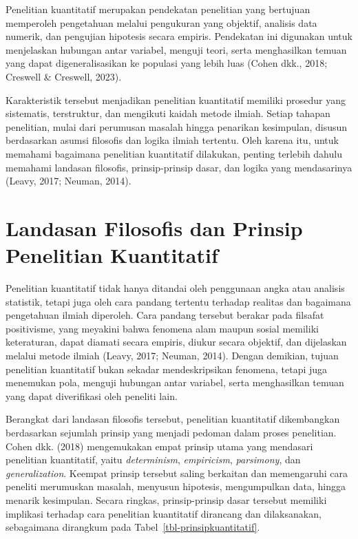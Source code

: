 \documentclass[
  indonesian,
  letterpaper,
  DIV=11,
  numbers=noendperiod]{scrreprt}
\begin{document}
Penelitian kuantitatif merupakan pendekatan penelitian yang bertujuan
memperoleh pengetahuan melalui pengukuran yang objektif, analisis data
numerik, dan pengujian hipotesis secara empiris. Pendekatan ini
digunakan untuk menjelaskan hubungan antar variabel, menguji teori,
serta menghasilkan temuan yang dapat digeneralisasikan ke populasi yang
lebih luas (Cohen dkk., 2018; Creswell \& Creswell, 2023).

Karakteristik tersebut menjadikan penelitian kuantitatif memiliki
prosedur yang sistematis, terstruktur, dan mengikuti kaidah metode
ilmiah. Setiap tahapan penelitian, mulai dari perumusan masalah hingga
penarikan kesimpulan, disusun berdasarkan asumsi filosofis dan logika
ilmiah tertentu. Oleh karena itu, untuk memahami bagaimana penelitian
kuantitatif dilakukan, penting terlebih dahulu memahami landasan
filosofis, prinsip-prinsip dasar, dan logika yang mendasarinya (Leavy,
2017; Neuman, 2014).

\section{Landasan Filosofis dan Prinsip Penelitian
Kuantitatif}\label{landasan-filosofis-dan-prinsip-penelitian-kuantitatif}

Penelitian kuantitatif tidak hanya ditandai oleh penggunaan angka atau
analisis statistik, tetapi juga oleh cara pandang tertentu terhadap
realitas dan bagaimana pengetahuan ilmiah diperoleh. Cara pandang
tersebut berakar pada filsafat positivisme, yang meyakini bahwa fenomena
alam maupun sosial memiliki keteraturan, dapat diamati secara empiris,
diukur secara objektif, dan dijelaskan melalui metode ilmiah (Leavy,
2017; Neuman, 2014). Dengan demikian, tujuan penelitian kuantitatif
bukan sekadar mendeskripsikan fenomena, tetapi juga menemukan pola,
menguji hubungan antar variabel, serta menghasilkan temuan yang dapat
diverifikasi oleh peneliti lain.

Berangkat dari landasan filosofis tersebut, penelitian kuantitatif
dikembangkan berdasarkan sejumlah prinsip yang menjadi pedoman dalam
proses penelitian. Cohen dkk. (2018) mengemukakan empat prinsip utama
yang mendasari penelitian kuantitatif, yaitu \emph{determinism},
\emph{empiricism}, \emph{parsimony}, dan \emph{generalization}. Keempat
prinsip tersebut saling berkaitan dan memengaruhi cara peneliti
merumuskan masalah, menyusun hipotesis, mengumpulkan data, hingga
menarik kesimpulan. Secara ringkas, prinsip-prinsip dasar tersebut
memiliki implikasi terhadap cara penelitian kuantitatif dirancang dan
dilaksanakan, sebagaimana dirangkum pada
Tabel~\ref{tbl-prinsipkuantitatif}.
\end{document}
